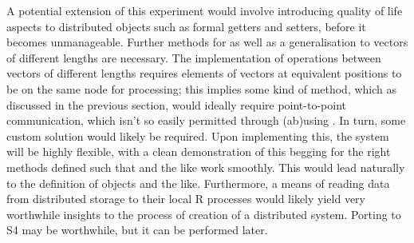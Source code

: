 A potential extension of this experiment would involve introducing quality of life aspects to distributed objects such as formal getters and setters, before it becomes unmanageable.
Further methods for  as well as a generalisation to vectors of different lengths are necessary.
The implementation of operations between vectors of different lengths requires elements of vectors at equivalent positions to be on the same node for processing; this implies some kind of  method, which as discussed in the previous section, would ideally require point-to-point communication, which isn't so easily permitted through (ab)using .
In turn, some custom solution would likely be required.
Upon implementing this, the system will be highly flexible, with a clean demonstration of this begging for the right methods defined such that  and the like work smoothly.
This would lead naturally to the definition of  objects and the like.
Furthermore, a means of reading data from distributed storage to their local R processes would likely yield very worthwhile insights to the process of creation of a distributed \R{} system.
Porting to S4 may be worthwhile, but it can be performed later.

